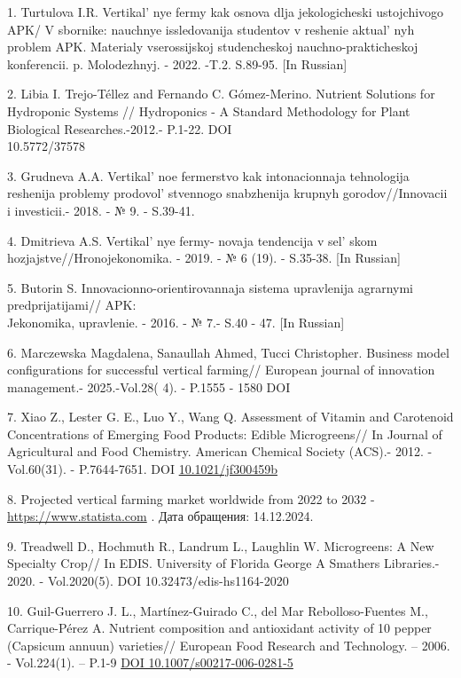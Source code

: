 \begin{references}
1. Turtulova I.R. Vertikal' nye fermy kak osnova dlja
jekologicheski ustojchivogo APK/ V sbornike: nauchnye issledovanija
studentov v reshenie aktual' nyh problem APK. Materialy
vserossijskoj studench\-eskoj nauchno-prakticheskoj konferencii. p.
Molodezhnyj. - 2022. -T.2. S.89-95. {[}In Russian{]}

2. Libia I. Trejo-Téllez and Fernando C. Gómez-Merino. Nutrient Solutions
for Hydroponic Systems // Hydroponics - A Standard Methodology for Plant
Biological Researches.-2012.- P.1-22. DOI \\10.5772/37578

3. Grudneva A.A. Vertikal' noe fermerstvo kak
intonacionnaja tehnologija reshenija problemy
prodovol' stvennogo snabzhenija krupnyh
gorodov//Innovacii i investicii.- 2018. - № 9. - S.39-41.

4. Dmitrieva A.S. Vertikal' nye fermy- novaja tendencija v
sel' skom hozjajstve//Hronojekonomika. - 2019. - № 6
(19). - S.35-38. {[}In Russian{]}

5. Butorin S. Innovacionno-orientirovannaja sistema upravlenija
agrarnymi predprijatijami// APK: \\Jekonomika, upravlenie. - 2016. - № 7.-
S.40 - 47. {[}In Russian{]}

6. Marczewska Magdalena, Sanaullah Ahmed, Tucci Christopher. Business
model configurations for suc\-cessful vertical farming// European journal
of innovation management.- 2025.-Vol.28( 4). - P.1555 - 1580 DOI
\href{http://dx.doi.org/10.1108/EJIM-01-2023-0017}{}

7. Xiao Z., Lester G. E., Luo Y., Wang Q. Assessment of Vitamin and
Carotenoid Concentrations of Emerging Food Products: Edible
Microgreens// In Journal of Agricultural and Food Chemistry. American
Chemical Society (ACS).- 2012. -Vol.60(31). - P.7644-7651. DOI
\href{https://doi.org/10.1021/jf300459b}{10.1021/jf300459b}

8. Projected vertical farming market worldwide from 2022 to 2032 -
\href{https://www.statista.com/statistics/487666/projection-vertical-farming-market-worldwide/}{https://www.statista.com}
. Дата обращения: 14.12.2024.

9. Treadwell D., Hochmuth R., Landrum L., Laughlin W. Microgreens: A New
Specialty Crop// In EDIS. University of Florida George A Smathers
Libraries.- 2020. - Vol.2020(5). DOI 10.32473/edis-hs1164-2020

10. Guil-Guerrero J. L., Martínez-Guirado C., del Mar Rebolloso-Fuentes
M., Carrique-Pérez A. Nutrient composition and antioxidant activity of
10 pepper (Capsicum annuun) varieties// European Food Research and
Technology. -- 2006. - Vol.224(1). -- P.1-9
\href{https://doi.org/10.1007/s00217-006-0281-5}{DOI
10.1007/s00217-006-0281-5}


\end{references}
